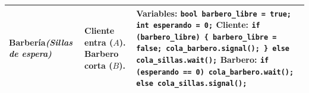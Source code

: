 \documentclass[11pt,a4paper]{article}
\begin{document}
\begin{table}[h!]
\begin{tabular}{p{3.2cm}p{4.6cm}p{8cm}}
\midrule
\textbf{Barbería}\newline \textit{(Sillas de espera)} & 
Cliente entra ($A$).\newline
Barbero corta ($B$). & 
\textbf{Variables:} \texttt{bool barbero\_libre = true; int esperando = 0;}\newline
\textbf{Cliente:} \texttt{if (barbero\_libre) \{ barbero\_libre = false; cola\_barbero.signal(); \} else cola\_sillas.wait();}\newline
\textbf{Barbero:} \texttt{if (esperando == 0) cola\_barbero.wait(); else cola\_sillas.signal();} \\
\bottomrule
\end{tabular}
\end{table}

\vspace{0.05cm}
\end{document}
